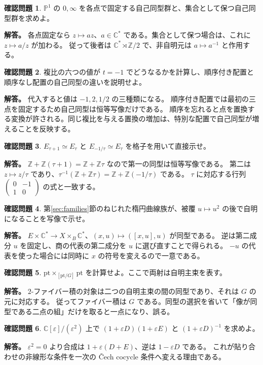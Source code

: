 \documentclass[dvipdfmx,a4paper,11pt]{article}
\theoremstyle{definition}
\newtheorem{ques}{確認問題}[section]
\newcommand{\C}{\mathbb C}\newcommand{\R}{\mathbb R}\newcommand{\Z}{\mathbb Z}\newcommand{\Q}{\mathbb Q}
\newcommand{\PP}{\mathbb P}\newcommand{\HH}{\mathbb H}
\newcommand{\eps}{\varepsilon}
\begin{document}
\begin{ques}
$\PP^1$ の $0,\infty$ を各点で固定する自己同型群と、集合として保つ自己同型群を求めよ。
\end{ques}
\textbf{解答。}
各点固定なら $z\mapsto az$、$a\in\C^*$ である。集合として保つ場合は、これに $z\mapsto a/z$ が加わる。
従って後者は $\C^*\rtimes\Z/2$ で、非自明元は $a\mapsto a^{-1}$ と作用する。

\begin{ques}
複比の六つの値が $t=-1$ でどうなるかを計算し、順序付き配置と順序なし配置の自己同型の違いを説明せよ。
\end{ques}
\textbf{解答。}
代入すると値は $-1,2,1/2$ の三種類になる。
順序付き配置では最初の三点を固定するため自己同型は恒等写像だけである。
順序を忘れると点を置換する変換が許される。同じ複比を与える置換の増加は、特別な配置で自己同型が増えることを反映する。

\begin{ques}
$E_{\tau+1}\simeq E_\tau$ と $E_{-1/\tau}\simeq E_\tau$ を格子を用いて直接示せ。
\end{ques}
\textbf{解答。}
$\Z+\Z(\tau+1)=\Z+\Z\tau$ なので第一の同型は恒等写像である。
第二は $z\mapsto z/\tau$ であり、$\tau^{-1}(\Z+\Z\tau)=\Z+\Z(-1/\tau)$ である。
$\tau$ に対応する行列 $\left(\begin{smallmatrix}0&-1\\1&0\end{smallmatrix}\right)$ の式と一致する。

\begin{ques}
第\ref{sec:families}節のねじれた楕円曲線族が、被覆 $u\mapsto u^2$ の後で自明になることを写像で示せ。
\end{ques}
\textbf{解答。}
$E\times\C^*\to X\times_B\C^*$、$(x,u)\mapsto([x,u],u)$ が同型である。
逆は第二成分 $u$ を固定し、商の代表の第二成分を $u$ に選び直すことで得られる。
$-u$ の代表を使った場合には同時に $x$ の符号を変えるので一意である。

\begin{ques}
$\mathrm{pt}\times_{[\mathrm{pt}/G]}\mathrm{pt}$ を計算せよ。ここで両射は自明主束を表す。
\end{ques}
\textbf{解答。}
$2$-ファイバー積の対象は二つの自明主束の間の同型であり、それは $G$ の元に対応する。
従ってファイバー積は $G$ である。同型の選択を省いて「像が同型である二点の組」だけを取ると一点になり、誤る。

\begin{ques}
$\C[\eps]/(\eps^2)$ 上で $(1+\eps D)(1+\eps E)$ と $(1+\eps D)^{-1}$ を求めよ。
\end{ques}
\textbf{解答。}
$\eps^2=0$ より合成は $1+\eps(D+E)$、逆は $1-\eps D$ である。
これが貼り合わせの非線形な条件を一次の Čech cocycle 条件へ変える理由である。
\end{document}
